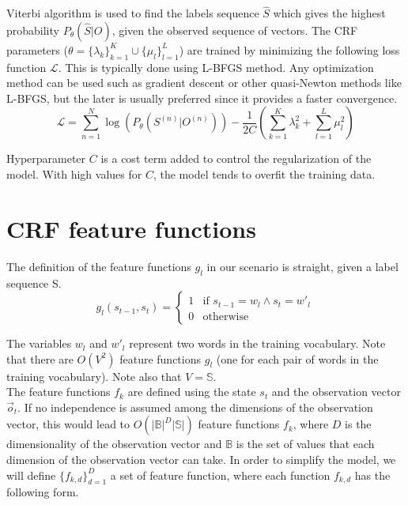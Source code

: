 \documentclass[10pt,a4paper]{article}
\begin{document}
Viterbi algorithm is used to find the labels sequence $\hat{S}$ which gives the highest probability $P_\theta(\hat{S}|O)$, given the observed sequence of vectors. The CRF parameters ($\theta = \{\lambda_k \}_{k=1}^K \cup \{\mu_l\}_{l=1}^L$) are trained by minimizing the following loss function $\mathcal{L}$. This is typically done using L-BFGS method. Any optimization method can be used such as gradient descent or other quasi-Newton methods like L-BFGS, but the later is usually preferred since it provides a faster convergence.\\

\begin{equation}\label{eq:crf_loss}
\mathcal{L} = \sum_{n=1}^N\log(P_\theta(S^{(n)} | O^{(n)})) - \frac{1}{2C} \left( \sum_{k=1}^K \lambda_k^2 + \sum_{l=1}^L \mu_l^2 \right)
\end{equation}

Hyperparameter $C$ is a cost term added to control the regularization of the model. With high values for $C$, the model tends to overfit the training data. 


\section{CRF feature functions}\label{sec:feature_funcs}
The definition of the feature functions $g_l$ in our scenario is straight, given a label sequence S.\\

\begin{equation}
g_l(s_{t-1}, s_{t}) = \begin{cases}
1 & \text{if } s_{t-1} = w_{l} \wedge s_{t} = w'_{l}\\
0 & \text{otherwise}
\end{cases}
\end{equation}

The variables $w_{l}$ and $w'_{l}$ represent two words in the training vocabulary. Note that there are $O(V^2)$ feature functions $g_l$ (one for each pair of words in the training vocabulary). Note also that $V = \mathbb{S}$.\\

The feature functions $f_k$ are defined using the state $s_t$ and the observation vector $\vec{o}_t$. If no independence is assumed among the dimensions of the observation vector, this would lead to $O(|\mathbb{B}|^D |\mathbb{S}|)$ feature functions $f_k$, where $D$ is the dimensionality of the observation vector and $\mathbb{B}$ is the set of values that each dimension of the observation vector can take. In order to simplify the model, we will define $\{f_{k,d}\}_{d=1}^D$ a set of feature function, where each function $f_{k,d}$ has the following form.\\
\end{document}
